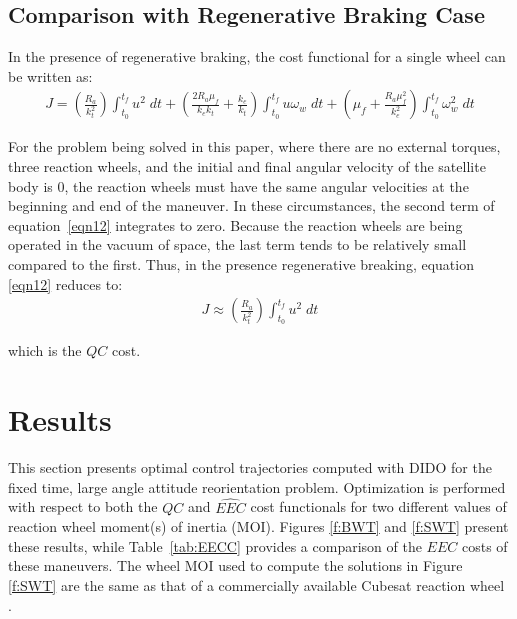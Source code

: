 \documentclass[letterpaper, paper,11pt]{AAS}
\begin{document}
\subsection{Comparison with Regenerative Braking Case}
In the presence of regenerative braking, the cost functional for a single wheel can be written as:
\begin{align}
\label{eqn12}
J =  \left(\frac{R_a}{k_t^2}\right)\int_{t_0}^{t_f}u^{2} \; dt + 
\left(\frac{2R_a\mu_f}{k_ek_t}+\frac{k_e}{k_t}\right) \int_{t_0}^{t_f}u\omega_w \; dt + 
\left(\mu_f+\frac{R_a\mu_f^2}{k_e^2}\right) \int_{t_0}^{t_f}\omega_w^{2} \; dt
\end{align}

\noindent For the problem being solved in this paper, where there are no external torques, three reaction wheels, and the initial and final angular velocity of the satellite body is 0, the reaction wheels must have the same angular velocities at the beginning and end of the maneuver. In these circumstances, the second term of equation~\ref{eqn12} integrates to zero.\cite{Marsh2015} Because the reaction wheels are being operated in the vacuum of space, the last term tends to be relatively small compared to the first. Thus, in the presence regenerative breaking, equation \ref{eqn12} reduces to:
\begin{align}
J \approx \left(\frac{R_a}{k_t^2}\right)\int_{t_0}^{t_f}u^{2} \; dt
\end{align}

\noindent which is the $QC$ cost. 

\section{Results}
This section presents optimal control trajectories computed with DIDO for the fixed time, large angle attitude reorientation problem. Optimization is performed with respect to both the $QC$ and $\hat{EEC}$ cost functionals for two different values of reaction wheel moment(s) of inertia (MOI). Figures \ref{f:BWT} and \ref{f:SWT} present these results, while Table~\ref{tab:EECC} provides a comparison of the $EEC$ costs of these maneuvers. The wheel MOI used to compute the solutions in Figure \ref{f:SWT} are the same as that of a commercially available Cubesat reaction wheel \cite{BCTdatasheet}.
\end{document}
